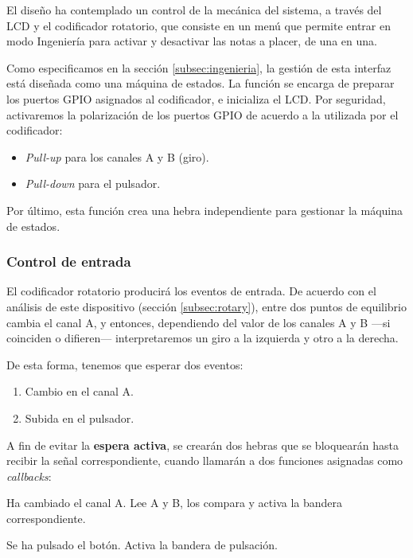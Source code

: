 El diseño ha contemplado un control de la mecánica del sistema, a través del \acrshort{LCD} y el codificador rotatorio, que consiste en un menú que permite entrar en modo Ingeniería para activar y desactivar las notas a placer, de una en una.

Como especificamos en la sección \ref{subsec:ingenieria}, la gestión de esta interfaz está diseñada como una máquina de estados. La función  se encarga de preparar los puertos \acrshort{GPIO} asignados al codificador, e inicializa el \acrshort{LCD}. Por seguridad, activaremos la polarización de los puertos \acrshort{GPIO} de acuerdo a la utilizada por el codificador:

\begin{itemize}
	\item \textit{Pull-up} para los canales A y B (giro).
	\item \textit{Pull-down} para el pulsador.
\end{itemize}

Por último, esta función crea una hebra independiente para gestionar la máquina de estados.

\subsubsection{Control de entrada}

El codificador rotatorio producirá los eventos de entrada. De acuerdo con el análisis de este dispositivo (sección \ref{subsec:rotary}), entre dos puntos de equilibrio cambia el canal A, y entonces, dependiendo del valor de los canales A y B ---si coinciden o difieren--- interpretaremos un giro a la izquierda y otro a la derecha.

De esta forma, tenemos que esperar dos eventos:

\begin{enumerate}
	\item Cambio en el canal A.
	\item Subida en el pulsador.
\end{enumerate}
	
A fin de evitar la \textbf{espera activa}, se crearán dos hebras que se bloquearán hasta recibir la señal correspondiente, cuando llamarán a dos funciones asignadas como \textit{callbacks}:

\begin{description}[style=nextline]
	\item[rot\_change()] Ha cambiado el canal A. Lee A y B, los compara y activa la bandera correspondiente.
	\item[rot\_push()] Se ha pulsado el botón. Activa la bandera de pulsación.
\end{description}

